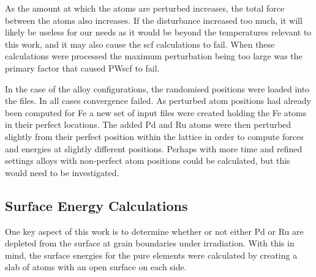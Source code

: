 As the amount at which the atoms are perturbed increases, the total force between the atoms also increases.  If the disturbance increased too much, it will likely be useless for our needs as it would be beyond the temperatures relevant to this work, and it may also cause the \acrshort{scf} calculations to fail.  When these calculations were processed the maximum perturbation being too large was the primary factor that caused PWscf to fail.

In the case of the alloy configurations, the randomised positions were loaded into the files.  In all cases convergence failed.  As perturbed atom positions had already been computed for \Gls{Fe} a new set of input files were created holding the \Gls{Fe} atoms in their perfect locations.  The added \Gls{Pd} and \Gls{Ru} atoms were then perturbed slightly from their perfect position within the lattice in order to compute forces and energies at slightly different positions.  Perhaps with more time and refined settings alloys with non-perfect atom positions could be calculated, but this would need to be investigated.


\FloatBarrier
\subsection{Surface Energy Calculations}

One key aspect of this work is to determine whether or not either Pd or Ru are depleted from the surface at grain boundaries under irradiation.  With this in mind, the surface energies for the pure elements were calculated by creating a slab of atoms with an open surface on each side.

